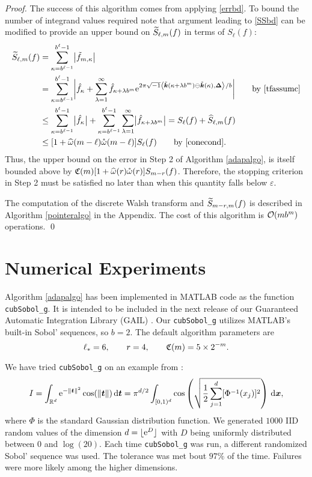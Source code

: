 \documentclass[graybox,footinfo]{svmult}
\newcommand{\R}{\mathbb{R}} %
\newcommand{\bst}{\boldsymbol{t}}    %
\newcommand{\bsx}{\boldsymbol{x}}    %
\newcommand{\bsDelta}{\boldsymbol{\Delta}}    %
\begin{document}
\begin{proof}
The success of this algorithm comes from applying \eqref{errbd}.  To bound the number of integrand values required note that argument leading to \eqref{SSbd} can be modified to provide an upper bound on $\widetilde{S}_{\ell,m}(f)$ in terms of $S_{\ell}(f)$:
\begin{align}
\nonumber
\tS_{\ell,m}(f) &= \sum_{\kappa=b^{\ell-1}}^{b^{\ell}-1} \bigabs{ \tf_{m,\kappa}}\\
\nonumber
& = \sum_{\kappa=b^{\ell-1}}^{b^{\ell}-1} \biggabs{\hf_{\kappa} + \sum_{\lambda=1}^{\infty} \hf_{\kappa+\lambda b^{m}} \E^{2 \pi \sqrt{-1} \ip{\tvk(\kappa+\lambda b^{m}) \ominus \tvk(\kappa)}{\bsDelta}/b}} \qquad \text{by \eqref{tfassumc}}\\
\nonumber
&\le \sum_{\kappa=b^{\ell-1}}^{b^{\ell}-1} \bigabs{\hf_{\kappa}} + \sum_{\kappa=b^{\ell-1}}^{b^{\ell}-1} \sum_{\lambda=1}^{\infty} \bigabs{\hf_{\kappa+\lambda b^{m}}} 
= S_{\ell}(f) + \hS_{\ell,m}(f) \\
\nonumber
&\le [1  + \homega(m-\ell) \wcomega(m-\ell)] S_\ell(f) \qquad \text{by \eqref{conecond}}. \label{SSbd3}
\end{align}
Thus, the upper bound on the error in Step 2 of Algorithm \ref{adapalgo}, is itself bounded above by $\mathfrak{C}(m) [1  + \widehat{\omega}(r) \mathring{\omega}(r)] S_{m-r}(f)$.  Therefore, the stopping criterion in Step 2 must be satisfied no later than when this quantity falls below $\varepsilon$. 

The computation of the discrete Walsh transform and $\widetilde{S}_{m-r,m}(f)$ is described in Algorithm \ref{pointeralgo} in the Appendix.  The cost of this algorithm is $\mathcal{O}(mb^m)$ operations. \hfill \qed
\end{proof}

\section{Numerical Experiments} \label{numexpsec}

Algorithm \ref{adapalgo} has been implemented in MATLAB code as the function \texttt{cubSobol\_g}. It is intended to be included in the next release of our Guaranteed Automatic Integration Library (GAIL) \cite{ChoEtal14a}.  Our \texttt{cubSobol\_g} utilizes MATLAB's built-in Sobol' sequences, so $b=2$.  The default algorithm parameters are 
\[
\ell_*=6, \qquad r=4, \qquad \mathfrak{C}(m)=5 \times 2^{-m}.
\]

We have tried \texttt{cubSobol\_g} on an example from \cite{Kei96}:
\begin{equation} \label{KeisterEx}
I=\int_{\R^d} \E^{-\norm{\bst}^2} \cos(\norm{\bst}) \, \D \bst 
= \pi^{d/2}\int_{\cube} \cos\left(\sqrt{\frac 12 \sum_{j=1}^d [\Phi^{-1}(x_j)]^2} \right) \, \D \bsx,
\end{equation}
where $\Phi$ is the standard Gaussian distribution function.  We generated $1000$ IID random values of the dimension $d=\lfloor \mathrm{e}^D \rfloor$ with $D$ being uniformly distributed between $0$ and $\log(20)$.  Each time \texttt{cubSobol\_g} was run, a different randomized Sobol' sequence was used.  The tolerance was met bout $97\%$ of the time.  Failures were more likely among the higher dimensions.
\end{document}
